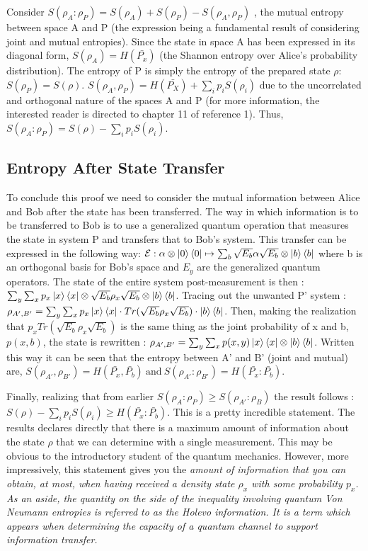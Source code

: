 \documentclass[letterpaper,twoside,10pt]{article}
\begin{document}
Consider $S(\rho_A:\rho_P) = S(\rho_A)+S(\rho_P)-S(\rho_A,\rho_P) $ , the mutual entropy between space A and P (the expression being a fundamental result of considering joint and mutual entropies). Since the state in space A has been expressed in its diagonal form, $S(\rho_A)=H(\bar {P_x})$ (the Shannon entropy over Alice's probability distribution). The entropy of P is simply the entropy of the prepared state $\rho$: $S(\rho_P)=S(\rho)$. $S(\rho_A,\rho_P)=H(\bar {P_X})+\sum_i p_i S(\rho_i)$ due to the uncorrelated and orthogonal nature of the spaces A and P (for more information, the interested reader is directed to chapter 11 of reference 1). Thus, $S(\rho_A:\rho_P)=S(\rho)-\sum_i p_iS(\rho_i)$.

\subsection{Entropy After State Transfer}
To conclude this proof we need to consider the mutual information between Alice and Bob after the state has been transferred. The way in which information is to be transferred to Bob is to use a generalized quantum operation that measures the state in system P and transfers that to Bob's system. This transfer can be expressed in the following way: $\mathcal{E}: \alpha \otimes \ket{0}\bra{0} \mapsto \sum_b \sqrt{E_b}\alpha\sqrt{E_b}\otimes\ket{b}\bra{b}$ where b is an orthogonal basis for Bob's space and $E_y$ are the generalized quantum operators. The state of the entire system post-measurement is then : $\sum_y\sum_xp_x\ket{x}\bra{x}\otimes\sqrt{E_b}\rho_x\sqrt{E_b}\otimes\ket{b}\bra{b}$. Tracing out the unwanted P' system : $\rho_{A',B'} =  \sum_y\sum_x p_x\ket{x}\bra{x} \cdot Tr(\sqrt{E_b}\rho_x\sqrt{E_b})\cdot\ket{b}\bra{b}$. Then, making the realization that $p_x Tr(\sqrt{E_b}\rho_x\sqrt{E_b})$ is the same thing as the joint probability of x and b, $p(x,b)$, the state is rewritten : $\rho_{A',B'} =  \sum_y\sum_x p(x,y) \ket{x}\bra{x}\otimes\ket{b}\bra{b}$. Written this way it can be seen that the entropy between A' and B' (joint and mutual) are, $S(\rho_{A'},\rho_{B'}) = H(\bar{P_x},\bar{P_b})~\text{and}~S(\rho_{A'}:\rho_{B'})=H(\bar{P_x}:\bar{P_b})$.

Finally, realizing that from earlier $S(\rho_A:\rho_P)\ge S(\rho_{A'}:\rho_{B})$ the result follows : $S(\rho)-\sum_ip_iS(\rho_i) \ge H(\bar{P_x}:\bar{P_b})$. This is a pretty incredible statement. The results declares directly that there is a maximum amount of information about the state $\rho$ that we can determine with a single measurement. This may be obvious to the introductory student of the quantum mechanics. However, more impressively, this statement gives you the \em amount of information \em that you can obtain, at most, when having received a density state $\rho_x$ with some probability $p_x$.  As an aside, the quantity on the side of the inequality involving quantum Von Neumann entropies is referred to as the Holevo information. It is a term which appears when determining the capacity of a quantum channel to support information transfer.
\end{document}
